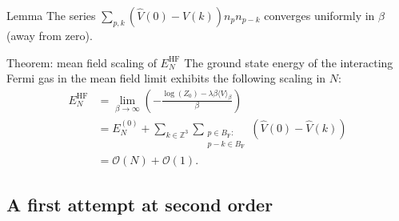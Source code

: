 \documentclass{beamer}
\begin{document}
\begin{frame}
	\begin{block}{Lemma}
		The series $\sum_{p,k}(\hat{V}(0)-\hat{V}(k))n_pn_{p-k}$ converges uniformly in
		$\beta$ (away from zero).
	\end{block}
	\begin{block}{Theorem: mean field scaling of $E^{\mathrm{HF}}_N$}
		The ground state energy of the interacting Fermi gas in the mean field limit exhibits
		the following scaling in $N$:
		\begin{align*}
			E^{\mathrm{HF}}_N
			&= \lim_{\beta\to\infty}\left(
				-\frac{\log(Z_0) - \lambda\beta\langle V\rangle_\beta}{\beta}
			\right)\\
			&= E^{(0)}_N + \sum_{k\in\mathbb{Z}^3}\sum_{\substack{p\in B_{\mathrm{F}}:\\p-k\in B_{\mathrm{F}}}}\left(\hat{V}(0) - \hat{V}(k)\right)\\
			&= \mathcal{O}(N) + \mathcal{O}(1).
		\end{align*}
	\end{block}
\end{frame}

\subsection{A first attempt at second order}
\end{document}
